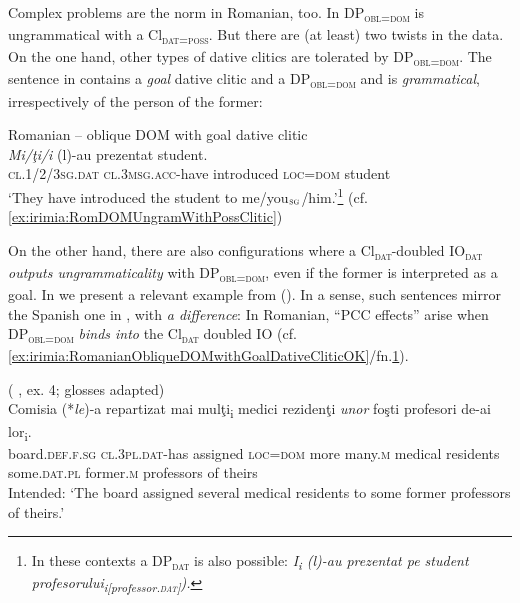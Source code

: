 \documentclass[output=paper,colorlinks,citecolor=brown,draft,draftmode]{langscibook}
\begin{document}
Complex problems are the norm in Romanian, too. In  DP\textsubscript{\textsc{obl=dom}} is ungrammatical with a Cl\textsubscript{\textsc{dat=poss}}. But there are (at least) two twists in the data. On the one hand, other types of dative clitics are tolerated by DP\textsubscript{\textsc{obl=dom}}. The sentence in  contains a \textit{goal} dative clitic and a DP\textsubscript{\textsc{obl=dom}} and is \textit{grammatical}, irrespectively of the person of the former:

\ea
{Romanian -- \Checkmark oblique DOM with goal dative clitic} \\
\gll \Checkmark\textit{Mi/\c ti/i} (l)-au prezentat  student. \\
\textsc{cl.1/2/3sg.dat} \textsc{cl.3msg.acc}-have introduced \textsc{loc=dom} student \\ 
\glt `They have introduced the student to me/you$_\textsc{sg}$/him.'\footnote{\label{fn:irimia:9}In these contexts a DP\textsubscript{\textsc{dat}} is also possible: \textit{I\textsubscript{i} (l)-au prezentat pe student profesorului\textsubscript{i}\textsubscript{[professor.\textsc{dat}]}). } } (cf. \ref{ex:irimia:RomDOMUngramWithPossClitic}) \label{ex:irimia:RomanianObliqueDOMwithGoalDativeCliticOK}
\z

On the other hand, there are also configurations where a Cl\textsubscript{\textsc{dat}}-doubled IO\textsubscript{\textsc{dat}} \textit{outputs ungrammaticality} with DP\textsubscript{\textsc{obl=dom}}, even if the former is interpreted as a goal. In  we present a relevant example from \citeauthor{cornil2020} (\citeyear{cornil2020}). In a sense, such sentences mirror the Spanish one in , with \textit{a difference}: In Romanian, ``\textsc{PCC} effects'' arise when DP\textsubscript{\textsc{obl=dom}} \textit{binds into} the Cl\textsubscript{\textsc{dat}} doubled IO (cf. \ref{ex:irimia:RomanianObliqueDOMwithGoalDativeCliticOK}/fn.\ref{fn:irimia:9}).



  (\citeauthor{cornil2020} \citeyear{cornil2020}, ex. 4; glosses adapted) \\
\gll Comisia (*\textit{le})-a repartizat  mai mul\c ti\textsubscript{i} medici reziden\c ti \textit{unor} foşti profesori de-ai lor\textsubscript{i}.\\
board.\textsc{def.f.sg} \textsc{cl.3pl.dat}-has assigned \textsc{loc=dom} more many.\textsc{m} medical residents some.\textsc{dat.pl} former.\textsc{m} professors of theirs \\
\glt Intended: `The board assigned several medical residents to some former professors of theirs.' \label{ex:irimia:RomanianDOMClDoubledDativeUngrammatical}
\z
\end{document}
